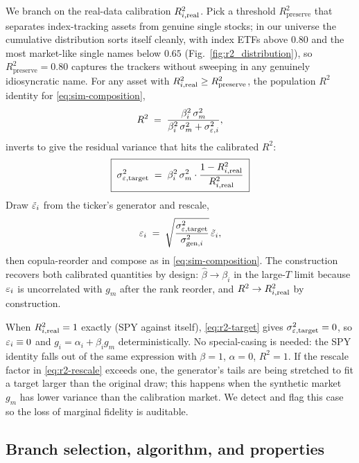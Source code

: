We branch on the real-data calibration $R^2_{i,\mathrm{real}}$. Pick a threshold
$R^2_{\mathrm{preserve}}$ that separates index-tracking assets from
genuine single stocks; in our universe the cumulative distribution sorts
itself cleanly, with index ETFs above $0.80$ and the most market-like
single names below $0.65$ (Fig.~\ref{fig:r2_distribution}), so
$R^2_{\mathrm{preserve}} = 0.80$ captures the trackers without
sweeping in any genuinely idiosyncratic name. For any
asset with $R^2_{i,\mathrm{real}} \ge R^2_{\mathrm{preserve}}$, the population
$R^2$ identity for \eqref{eq:sim-composition},
\begin{equation}
  R^2 \;=\; \frac{\beta_i^2\, \sigma_m^2}{\beta_i^2\, \sigma_m^2 + \sigma_{\varepsilon,i}^2},
\end{equation}
inverts to give the residual variance that hits the calibrated $R^2$:
\begin{equation}
  \boxed{\;\sigma_{\varepsilon,\mathrm{target}}^2 \;=\; \beta_i^2\, \sigma_m^2 \cdot
    \frac{1 - R^2_{i,\mathrm{real}}}{R^2_{i,\mathrm{real}}}\;}
  \label{eq:r2-target}
\end{equation}
Draw $\tilde{\varepsilon}_i$ from the ticker's generator and rescale,
\begin{equation}
  \varepsilon_i \;=\; \sqrt{\frac{\sigma_{\varepsilon,\mathrm{target}}^2}{\sigma_{\mathrm{gen},i}^2}}\,\tilde{\varepsilon}_i,
  \label{eq:r2-rescale}
\end{equation}
then copula-reorder and compose as in \eqref{eq:sim-composition}. The
construction recovers both calibrated quantities by design:
$\hat\beta \to \beta_i$ in the large-$T$ limit because $\varepsilon_i$ is
uncorrelated with $g_m$ after the rank reorder, and $R^2 \to R^2_{i,\mathrm{real}}$
by construction.

When $R^2_{i,\mathrm{real}} = 1$ exactly (SPY against itself), \eqref{eq:r2-target}
gives $\sigma_{\varepsilon,\mathrm{target}}^2 = 0$, so $\varepsilon_i \equiv 0$ and
$g_i = \alpha_i + \beta_i g_m$ deterministically. No special-casing is
needed: the SPY identity falls out of the same expression with
$\beta = 1$, $\alpha = 0$, $R^2 = 1$. If the rescale factor in
\eqref{eq:r2-rescale} exceeds one, the generator's tails are being stretched
to fit a target larger than the original draw; this happens when the
synthetic market $g_m$ has lower variance than the calibration market.
We detect and flag this case so the loss of marginal fidelity is auditable.

\subsection{Branch selection, algorithm, and properties}
\label{sec:method-algorithm}

